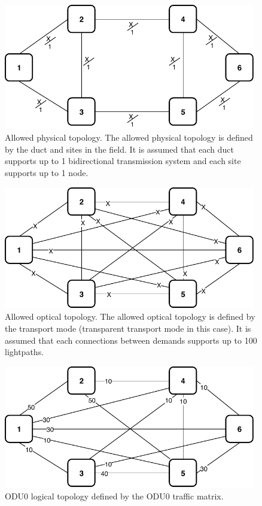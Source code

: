 \begin{figure}[h!]
\centering
\includegraphics[width=11cm]{sdf/ilp/transparent_protection/figures/allowed_physical_topology}
\caption{Allowed physical topology. The allowed physical topology is defined by the duct and sites in the field. It is assumed that each duct supports up to 1 bidirectional transmission system and each site supports up to 1 node.}
\label{allowed2_physical_protectionmedium}
\end{figure}

\newpage
\begin{figure}[h!]
\centering
\includegraphics[width=11cm]{sdf/ilp/transparent_protection/figures/allowed_optical_topology}
\caption{Allowed optical topology. The allowed optical topology is defined by the transport mode (transparent transport mode in this case). It is assumed that each connections between demands supports up to 100 lightpaths.}
\label{allowed2_optical_protectionmedium}
\end{figure}

\begin{figure}[h!]
\centering
\includegraphics[width=11cm]{sdf/ilp/transparent_protection/figures/logical_topology_ODU0_medium}
\caption{ODU0 logical topology defined by the ODU0 traffic matrix.}
\label{logical2_ODU0_protectionmedium}
\end{figure}

